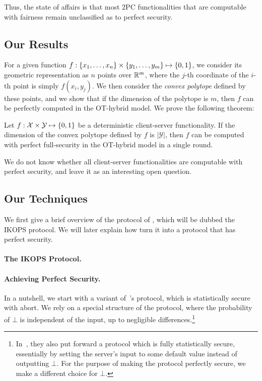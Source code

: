 \documentclass{llncs}
\newcommand{\bnote}[1]{\authnote{Bar}{#1}}
\newcommand{\X}{\mathcal{X}}
\newcommand{\Y}{\mathcal{Y}}
\begin{document}
Thus, the state of affairs is that most 2PC functionalities that are computable with fairness remain unclassified as to perfect security. 

\subsection{Our Results}\label{sec:results}
For a given function $f : \left\{x_1, \ldots, x_n\right\} \times \left\{y_1, \ldots , y_m\right\} \mapsto \{0,1\}$, we consider its geometric representation as $n$ points over ${\mathbb R}^m$, where the $j$-th coordinate of the $i$-th
point is simply $f(x_i, y_j)$. We then consider the \emph{convex polytope} defined by these points, and we show that if the dimension of the polytope is $m$, then $f$ can be perfectly computed in the OT-hybrid model. We prove the following theorem:

\begin{theorem}[Informal]
	Let $f:\X \times \Y \mapsto \zo$ be a deterministic \bnote{Does it has to be deterministic?} client-server functionality. If the dimension of the convex polytope defined by $f$ is $|\Y|$, then $f$ can be computed with perfect full-security in the OT-hybrid model in a single round.
\end{theorem}

We do not know whether all client-server functionalities are computable with perfect security, and leave it as an interesting open question.

\subsection{Our Techniques}
We first give a brief overview of the protocol of \cite{IKOPS11}, which will be dubbed the IKOPS protocol. We will later explain how turn it into a protocol that has perfect security.

\paragraph{The IKOPS Protocol.}

\paragraph{Achieving Perfect Security.}

In a nutshell, we start with a variant of~\cite{IKOPS11}'s protocol, which is statistically secure with abort. We rely on a special structure of the protocol, where the probability of $\bot$ is independent of the input, up to negligible differences.\footnote{In~\cite{IKOPS11},
they also put forward a protocol which is fully statistically secure, essentially by setting the server's input to some default value instead of outputting $\bot$. For the purpose of making the protocol perfectly secure, we make a different choice for $\bot$.}
\end{document}
